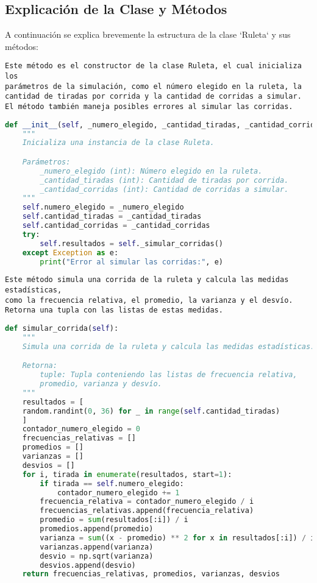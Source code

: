 \documentclass{article}
\begin{document}
\subsection{Explicación de la Clase y Métodos}

A continuación se explica brevemente la estructura de la clase `Ruleta` y sus métodos:

\begin{itemize}
\begin{verbatim}
Este método es el constructor de la clase Ruleta, el cual inicializa los
parámetros de la simulación, como el número elegido en la ruleta, la
cantidad de tiradas por corrida y la cantidad de corridas a simular.
El método también maneja posibles errores al simular las corridas.
\end{verbatim}


\begin{lstlisting}[language=Python]
def __init__(self, _numero_elegido, _cantidad_tiradas, _cantidad_corridas):
    """
    Inicializa una instancia de la clase Ruleta.

    Parámetros:
        _numero_elegido (int): Número elegido en la ruleta.
        _cantidad_tiradas (int): Cantidad de tiradas por corrida.
        _cantidad_corridas (int): Cantidad de corridas a simular.
    """
    self.numero_elegido = _numero_elegido
    self.cantidad_tiradas = _cantidad_tiradas
    self.cantidad_corridas = _cantidad_corridas
    try:
        self.resultados = self._simular_corridas()
    except Exception as e:
        print("Error al simular las corridas:", e)
\end{lstlisting}

\begin{verbatim}
Este método simula una corrida de la ruleta y calcula las medidas estadísticas,
como la frecuencia relativa, el promedio, la varianza y el desvío.
Retorna una tupla con las listas de estas medidas.
\end{verbatim}
\clearpage

\begin{lstlisting}[language=Python]
def simular_corrida(self):
    """
    Simula una corrida de la ruleta y calcula las medidas estadísticas.

    Retorna:
        tuple: Tupla conteniendo las listas de frecuencia relativa,
        promedio, varianza y desvío.
    """
    resultados = [
    random.randint(0, 36) for _ in range(self.cantidad_tiradas)
    ]
    contador_numero_elegido = 0
    frecuencias_relativas = []
    promedios = []
    varianzas = []
    desvios = []
    for i, tirada in enumerate(resultados, start=1):
        if tirada == self.numero_elegido:
            contador_numero_elegido += 1
        frecuencia_relativa = contador_numero_elegido / i
        frecuencias_relativas.append(frecuencia_relativa)
        promedio = sum(resultados[:i]) / i
        promedios.append(promedio)
        varianza = sum((x - promedio) ** 2 for x in resultados[:i]) / i
        varianzas.append(varianza)
        desvio = np.sqrt(varianza)
        desvios.append(desvio)
    return frecuencias_relativas, promedios, varianzas, desvios
\end{lstlisting}


\end{itemize}
\end{document}

